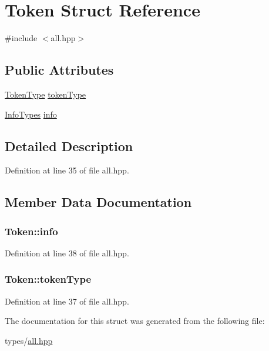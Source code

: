 \hypertarget{struct_token}{}\section{Token Struct Reference}
\label{struct_token}


{\ttfamily \#include $<$all.\+hpp$>$}

\subsection*{Public Attributes}
\begin{DoxyCompactItemize}
\item 
\hyperlink{arch_8hpp_aa520fbf142ba1e7e659590c07da31921}{Token\+Type} \hyperlink{struct_token_a3d2b3146021ae2acd9e1b33bf5e59c78}{token\+Type}
\item 
\hyperlink{all_8hpp_a58b4bafc5e94cba5e42b944a85b061db}{Info\+Types} \hyperlink{struct_token_a4c338f6ca199f4a8575e877d36d03a06}{info}
\end{DoxyCompactItemize}


\subsection{Detailed Description}


Definition at line 35 of file all.\+hpp.



\subsection{Member Data Documentation}
\hypertarget{struct_token_a4c338f6ca199f4a8575e877d36d03a06}{}
\subsubsection[{info}]{ Token\+::info}\label{struct_token_a4c338f6ca199f4a8575e877d36d03a06}


Definition at line 38 of file all.\+hpp.

\hypertarget{struct_token_a3d2b3146021ae2acd9e1b33bf5e59c78}{}
\subsubsection[{token\+Type}]{ Token\+::token\+Type}\label{struct_token_a3d2b3146021ae2acd9e1b33bf5e59c78}


Definition at line 37 of file all.\+hpp.



The documentation for this struct was generated from the following file\+:\begin{DoxyCompactItemize}
\item 
types/\hyperlink{all_8hpp}{all.\+hpp}\end{DoxyCompactItemize}
